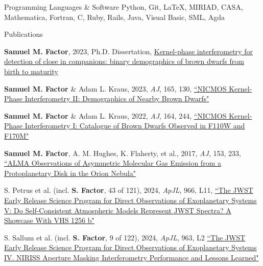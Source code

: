 \documentclass{resume} %
\begin{document}
\begin{rSection}{Programming Languages \& Software} \itemsep -3pt {}   
Python, Git, \LaTeX, MIRIAD, CASA, Mathematica, Fortran, C, Ruby, Rails, Java, Visual Basic, SML, Agda
\end{rSection}


\begin{rSection}{Publications}\itemsep -3pt

    \textbf{Samuel M. Factor}, 2023, Ph.D. Dissertation, \href{https://search.lib.utexas.edu/permalink/01UTAU_INST/9e1640/alma991058743782406011}{Kernel-phase interferometry for detection of close in companions: binary demographics of brown dwarfs from birth to maturity}
    
    \textbf{Samuel M. Factor} \& Adam L. Kraus, 2023, {\it AJ}, 165, 130, \href{https://ui.adsabs.harvard.edu/abs/2023AJ....165..130F}{``NICMOS Kernel-Phase Interferometry II: Demographics of Nearby Brown Dwarfs"}
    
    \textbf{Samuel M. Factor} \& Adam L. Kraus, 2022, {\it AJ}, 164, 244, \href{https://ui.adsabs.harvard.edu/abs/2022AJ....164..244F}{``NICMOS Kernel-Phase Interferometry I: Catalogue of Brown Dwarfs Observed in F110W and F170M"}
    
    \textbf{Samuel M. Factor}, A. M. Hughes, K. Flaherty, et al., 2017, {\it AJ}, 153, 233, \href{http://ui.adsabs.harvard.edu/abs/2017AJ....153..233F}{``ALMA Observations of Asymmetric Molecular Gas Emission from a Protoplanetary Disk in the Orion Nebula"} %
    
    S. Petrus et al. (incl. \textbf{S. Factor}, 43 of 121), 2024, {\it ApJL}, 966, L11, \href{https://ui.adsabs.harvard.edu/abs/2024ApJ...966L..11P}{``The JWST Early Release Science Program for Direct Observations of Exoplanetary Systems V: Do Self-Consistent Atmospheric Models Represent JWST Spectra? A Showcase With VHS 1256 b"}

    S. Sallum et al. (incl. \textbf{S. Factor}, 9 of 122), 2024, {\it ApJL}, 963, L2 \href{https://ui.adsabs.harvard.edu/abs/2024ApJ...963L...2S}{``The JWST Early Release Science Program for Direct Observations of Exoplanetary Systems IV. NIRISS Aperture Masking Interferometry Performance and Lessons Learned"}
    

\end{rSection}
\end{document}
